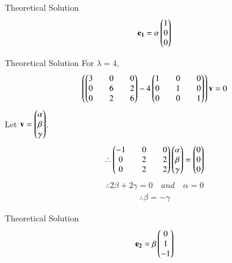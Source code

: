 \documentclass{beamer}
\begin{document}
\begin{frame}{Theoretical Solution}
\begin{align}
    \mathbf{e_1}=\alpha \begin{pmatrix}1\\0\\0\end{pmatrix}
\end{align}

\end{frame}

\begin{frame}{Theoretical Solution}
For $\lambda=4$,
\begin{align}
    \left(\begin{pmatrix}3&&0&&0\\0&&6&&2\\0&&2&&6\end{pmatrix}-4\begin{pmatrix}1&&0&&0\\0&&1&&0\\0&&0&&1\end{pmatrix}\right)\mathbf{v}=0
\end{align}
Let $\mathbf{v}=\begin{pmatrix}\alpha\\\beta\\\gamma\end{pmatrix}$.
\begin{align}
    \therefore \begin{pmatrix}-1&&0&&0\\0&&2&&2\\0&&2&&2\end{pmatrix}\begin{pmatrix}\alpha\\\beta\\\gamma\end{pmatrix}=\begin{pmatrix}0\\0\\0\end{pmatrix} 
\end{align}
\begin{align}
    \therefore 2\beta+2\gamma=0 \quad and \quad \alpha=0
\end{align}
\begin{align}
    \therefore \beta=-\gamma
\end{align}
\end{frame}

\begin{frame}{Theoretical Solution}
\begin{align}
    \mathbf{e_2}=\beta\begin{pmatrix}0\\1\\-1\end{pmatrix}
\end{align}
\end{frame}
\end{document}
